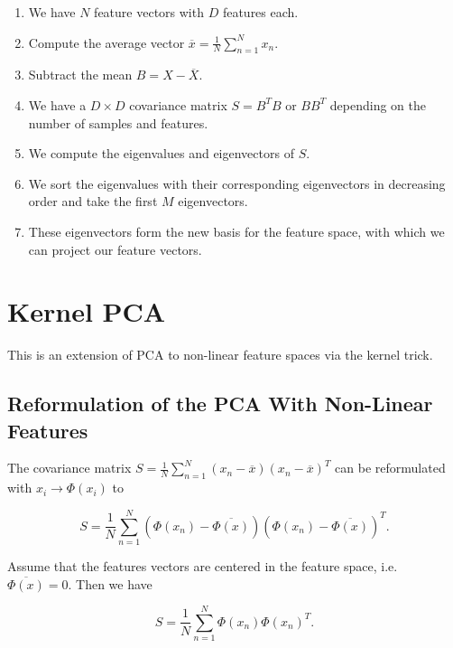 \begin{enumerate}

	\item We have \(N\) feature vectors with \(D\) features each.

	\item Compute the average vector  \(\overline{x} = \frac{1}{N} \sum_{n = 1}^{N} x_n\).

	\item Subtract the mean \(B = X - \overline{X}\).

	\item We have a \(D \times D\) covariance matrix \(S = B^T B\) or \(BB^T\) depending on the number of samples and features.

	\item We compute the eigenvalues and eigenvectors of \(S\).

	\item We sort the eigenvalues with their corresponding eigenvectors in decreasing order and take the first \(M\) eigenvectors.

	\item These eigenvectors form the new basis for the feature space, with which we can project our feature vectors.

\end{enumerate}

\section{Kernel PCA}

This is an extension of PCA to non-linear feature spaces via the kernel trick.

\subsection{Reformulation of the PCA With Non-Linear Features}

The covariance matrix \(S = \frac{1}{N} \sum_{n = 1}^{N} (x_n - \overline{x})(x_n - \overline{x})^T\) can
be reformulated with \(x_i \to \Phi(x_i)\) to

\[
	S = \frac{1}{N} \sum_{n = 1}^{N} (\Phi(x_n) - \overline{\Phi(x)})(\Phi(x_n) - \overline{\Phi(x)})^T.
\]

Assume that the features vectors are centered in the feature space, i.e. \(\overline{\Phi(x)} = 0\).
Then we have

\[
	S = \frac{1}{N} \sum_{n = 1}^{N} \Phi(x_n) \Phi(x_n)^T.
\]

